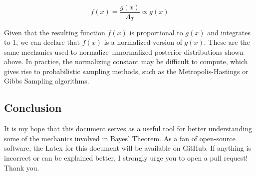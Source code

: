 \documentclass[12pt]{article}
\begin{document}
\begin{equation}
f(x) =  \frac{g(x)} {A_T} \propto g(x)
\end{equation}

\noindent Given that the resulting function $f(x)$ is proportional to $g(x)$ and integrates to 1, we can declare that $f(x)$ is a normalized version of $g(x)$. These are the same mechanics used to normalize unnormalized posterior distributions shown above. In practice, the normalizing constant may be difficult to compute, which gives rise to probabilistic sampling methods, such as the Metropolis-Hastings or Gibbs Sampling algorithms.

\subsection*{Conclusion}
\noindent It is my hope that this document serves as a useful tool for better understanding some of the mechanics involved in Bayes' Theorem. As a fan of open-source software, the Latex for this document will be available on GitHub. If anything is incorrect or can be explained better, I strongly urge you to open a pull request! Thank you.
\end{document}
